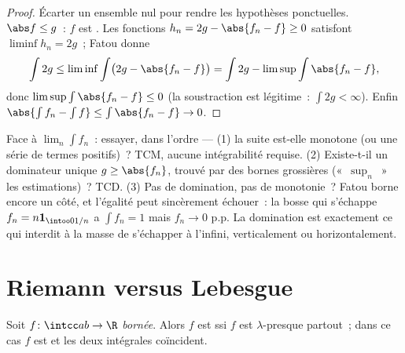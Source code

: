 \begin{proof}
Écarter un ensemble nul pour rendre les hypothèses
ponctuelles. $\abs f \leq g$~: $f$ est . Les
fonctions $h_n = 2g - \abs{f_n - f} \geq 0$ satisfont
$\liminf h_n = 2g$~; Fatou donne
\[
\int 2g \leq \liminf\int\bigl(2g - \abs{f_n - f}\bigr)
= \int 2g - \limsup\int\abs{f_n - f},
\]
donc $\limsup\int\abs{f_n - f} \leq 0$ (la soustraction est
légitime~: $\int 2g < \infty$). Enfin $\abs{\int f_n - \int
f} \leq \int\abs{f_n - f} \to 0$.
\end{proof}

\begin{method}\label{met:b3:lebesgue:convergence}
Face à $\lim_n\int f_n$~: essayer, dans l'ordre --- (1) la
suite est-elle monotone (ou une série de termes positifs)~?
TCM, aucune intégrabilité requise. (2) Existe-t-il un
dominateur  unique $g \geq \abs{f_n}$, trouvé par
des bornes grossières («~$\sup_n$~» les estimations)~? TCD.
(3) Pas de domination, pas de monotonie~? Fatou borne encore
un côté, et l'égalité peut sincèrement échouer~: la bosse
qui s'échappe $f_n = n\mathbf 1_{\intoo0{1/n}}$ a $\int f_n
= 1$ mais $f_n \to 0$ p.p. La domination est exactement ce
qui interdit à la masse de s'échapper à l'infini,
verticalement ou horizontalement.
\end{method}

\section{Riemann versus Lebesgue}

\begin{theorem}
\label{thm:b3:lebesgue:riemann}
Soit $f \colon \intcc ab \to \R$ \emph{bornée}. Alors $f$
est  ssi $f$ est 
$\lambda$-presque partout~; dans ce cas $f$ est
 et les deux intégrales
coïncident.
\end{theorem}

